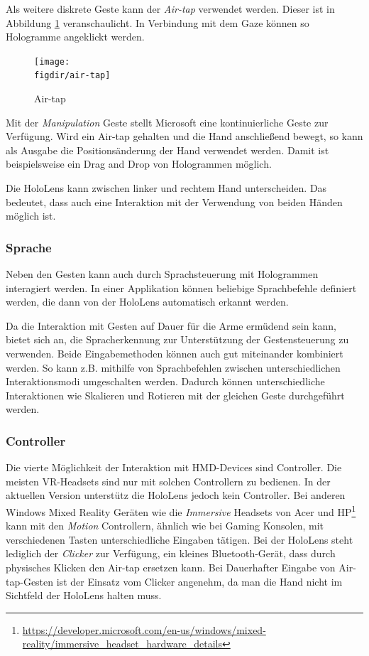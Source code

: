 Als weitere diskrete Geste kann der \textit{Air-tap} verwendet werden. Dieser ist in Abbildung \ref{fig:air-tap} veranschaulicht. In Verbindung mit dem Gaze können so Hologramme angeklickt werden.

\begin{figure}[htb]
  \texttt{[image: \\figdir/air-tap]}
  \caption{Air-tap \cite{windows2017gesture}}
  \label{fig:air-tap}
\end{figure}

Mit der \textit{Manipulation} Geste stellt Microsoft eine kontinuierliche Geste zur Verfügung. Wird ein Air-tap gehalten und die Hand anschließend bewegt, so kann als Ausgabe die Positionsänderung der Hand verwendet werden. Damit ist beispielsweise ein Drag and Drop von Hologrammen möglich.

Die HoloLens kann zwischen linker und rechtem Hand unterscheiden. Das bedeutet, dass auch eine Interaktion mit der Verwendung von beiden Händen möglich ist.

\subsubsection*{Sprache}
Neben den Gesten kann auch durch Sprachsteuerung mit Hologrammen interagiert werden. In einer Applikation können beliebige Sprachbefehle definiert werden, die dann von der HoloLens automatisch erkannt werden.

Da die Interaktion mit Gesten auf Dauer für die Arme ermüdend sein kann, bietet sich an, die Spracherkennung zur Unterstützung der Gestensteuerung zu verwenden. Beide Eingabemethoden können auch gut miteinander kombiniert werden. So kann z.B. mithilfe von Sprachbefehlen zwischen unterschiedlichen Interaktionsmodi umgeschalten werden. Dadurch können unterschiedliche Interaktionen wie Skalieren und Rotieren mit der gleichen Geste durchgeführt werden.

\subsubsection*{Controller}
Die vierte Möglichkeit der Interaktion mit HMD-Devices sind Controller. Die meisten VR-Headsets sind nur mit solchen Controllern zu bedienen. In der aktuellen Version unterstütz die HoloLens jedoch kein Controller. Bei anderen Windows Mixed Reality Geräten wie die \textit{Immersive} Headsets von Acer und HP\footnote{\url{https://developer.microsoft.com/en-us/windows/mixed-reality/immersive_headset_hardware_details}} kann mit den \textit{Motion} Controllern, ähnlich wie bei Gaming Konsolen, mit verschiedenen Tasten unterschiedliche Eingaben tätigen. Bei der HoloLens steht lediglich der \textit{Clicker} zur Verfügung, ein kleines Bluetooth-Gerät, dass durch physisches Klicken den Air-tap ersetzen kann. Bei Dauerhafter Eingabe von Air-tap-Gesten ist der Einsatz vom Clicker angenehm, da man die Hand nicht im Sichtfeld der HoloLens halten muss.

